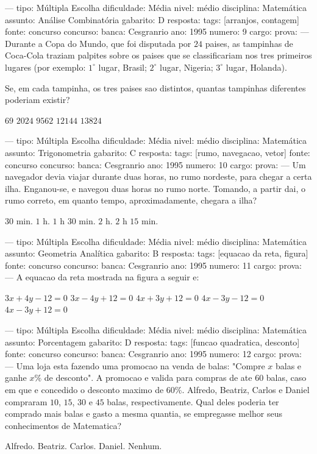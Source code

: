 ---
tipo: Múltipla Escolha
dificuldade: Média
nivel: médio
disciplina: Matemática
assunto: Análise Combinatória
gabarito: D
resposta:
tags: [arranjos, contagem]
fonte: concurso
concurso:
banca: Cesgranrio
ano: 1995
numero: 9
cargo:
prova:
---
\question
Durante a Copa do Mundo, que foi disputada por $24$ paises, as tampinhas de Coca-Cola traziam palpites sobre os paises que se classificariam nos tres primeiros lugares (por exemplo: $1^\circ$ lugar, Brasil; $2^\circ$ lugar, Nigeria; $3^\circ$ lugar, Holanda).

Se, em cada tampinha, os tres paises sao distintos, quantas tampinhas diferentes poderiam existir?
\begin{choices}
\choice $69$
\choice $2024$
\choice $9562$
\CorrectChoice $12144$
\choice $13824$
\end{choices}

---
tipo: Múltipla Escolha
dificuldade: Média
nivel: médio
disciplina: Matemática
assunto: Trigonometria
gabarito: C
resposta:
tags: [rumo, navegacao, vetor]
fonte: concurso
concurso:
banca: Cesgranrio
ano: 1995
numero: 10
cargo:
prova:
---
\question
Um navegador devia viajar durante duas horas, no rumo nordeste, para chegar a certa ilha. Enganou-se, e navegou duas horas no rumo norte. Tomando, a partir dai, o rumo correto, em quanto tempo, aproximadamente, chegara a ilha?
\begin{choices}
\choice $30$ min.
\choice $1$ h.
\CorrectChoice $1$ h $30$ min.
\choice $2$ h.
\choice $2$ h $15$ min.
\end{choices}

---
tipo: Múltipla Escolha
dificuldade: Média
nivel: médio
disciplina: Matemática
assunto: Geometria Analítica
gabarito: B
resposta:
tags: [equacao da reta, figura]
fonte: concurso
concurso:
banca: Cesgranrio
ano: 1995
numero: 11
cargo:
prova:
---
\question
A equacao da reta mostrada na figura a seguir e:
\begin{choices}
\choice $3x + 4y - 12 = 0$
\CorrectChoice $3x - 4y + 12 = 0$
\choice $4x + 3y + 12 = 0$
\choice $4x - 3y - 12 = 0$
\choice $4x - 3y + 12 = 0$
\end{choices}


---
tipo: Múltipla Escolha
dificuldade: Média
nivel: médio
disciplina: Matemática
assunto: Porcentagem
gabarito: D
resposta:
tags: [funcao quadratica, desconto]
fonte: concurso
concurso:
banca: Cesgranrio
ano: 1995
numero: 12
cargo:
prova:
---
\question
Uma loja esta fazendo uma promocao na venda de balas: "Compre $x$ balas e ganhe $x\%$ de desconto". A promocao e valida para compras de ate $60$ balas, caso em que e concedido o desconto maximo de $60\%$. Alfredo, Beatriz, Carlos e Daniel compraram $10$, $15$, $30$ e $45$ balas, respectivamente. Qual deles poderia ter comprado mais balas e gasto a mesma quantia, se empregasse melhor seus conhecimentos de Matematica?
\begin{choices}
\choice Alfredo.
\choice Beatriz.
\choice Carlos.
\CorrectChoice Daniel.
\choice Nenhum.
\end{choices}

